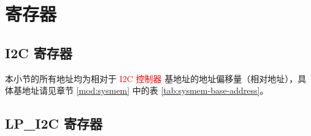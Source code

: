 \documentclass[main\_\_CN.tex]{subfiles}
\begin{document}
\section{寄存器}

\subsection{I2C 寄存器}
本小节的所有地址均为相对于 \textcolor{red}{I2C 控制器} 基地址的地址偏移量（相对地址），具体基地址请见章节 \ref{mod:sysmem} \textit{} 中的表 \ref{tab:sysmem-base-address}。



\subsection{LP\_I2C 寄存器}

\end{document}
